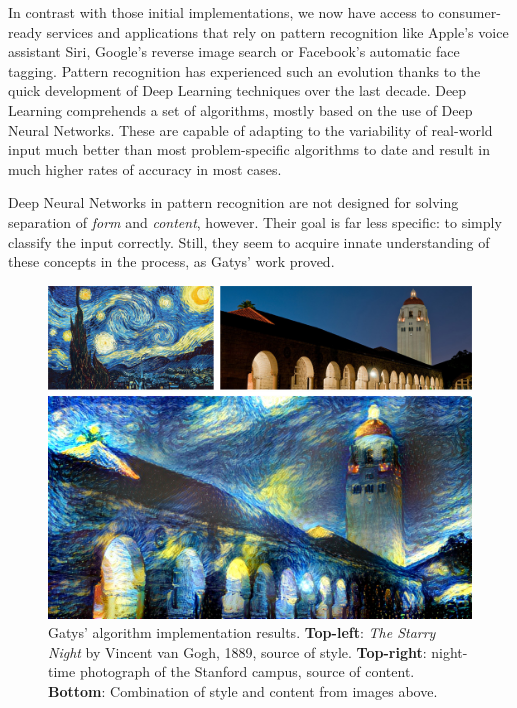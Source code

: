 In contrast with those initial implementations, we now have access to consumer-ready services and applications that rely on pattern recognition like Apple's voice assistant Siri, Google's reverse image search or Facebook's automatic face tagging.
Pattern recognition has experienced such an evolution thanks to the quick development of Deep Learning techniques over the last decade.
Deep Learning comprehends a set of algorithms, mostly based on the use of Deep Neural Networks.
These are capable of adapting to the variability of real-world input much better than most problem-specific algorithms to date and result in much higher rates of accuracy in most cases.

Deep Neural Networks in pattern recognition are not designed for solving separation of \emph{form} and \emph{content}, however.
Their goal is far less specific: to simply classify the input correctly.
Still, they seem to acquire innate understanding of these concepts in the process, as Gatys' work \cite{Gatys2015} proved.

\begin{figure}[htb]
  \includegraphics[width=\textwidth]{gfx/neural-style-composed}
  \caption{Gatys' algorithm implementation \cite{Johnson2015} results. \textbf{Top-left}: \textit{The Starry Night} by Vincent van Gogh, 1889, source of style. \textbf{Top-right}: night-time photograph of the Stanford campus, source of content. \textbf{Bottom}: Combination of style and content from images above.}
  \label{fig:sec:intro:neural-style}
\end{figure}

